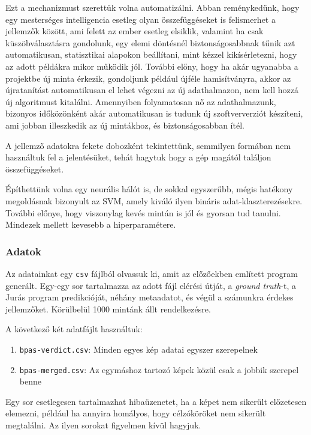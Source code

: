 Ezt a mechanizmust szerettük volna automatizálni. Abban reménykedünk, hogy egy 
mesterséges intelligencia esetleg olyan összefüggéseket is felismerhet a jellemzők
között, ami felett az ember esetleg elsiklik, valamint ha csak küszöbválasztásra
gondolunk, egy elemi döntésnél biztonságosabbnak tűnik azt automatikusan, statisztikai
alapokon beállítani, mint kézzel kikísérletezni, hogy az adott példákra mikor működik jól.
További előny, hogy ha akár ugyanabba a projektbe új minta érkezik, gondoljunk például újféle 
hamisítványra, akkor az újratanítást automatikusan el lehet végezni az új adathalmazon,
nem kell hozzá új algoritmust kitalálni. Amennyiben folyamatosan nő az adathalmazunk, 
bizonyos időközönként akár automatikusan is tudunk új szoftververziót készíteni,
ami jobban illeszkedik az új mintákhoz, és biztonságosabban ítél.


A jellemző adatokra fekete dobozként tekintettünk, semmilyen formában nem használtuk fel
a jelentésüket, tehát hagytuk hogy a gép magától találjon összefüggéseket.


Építhettünk volna egy neurális hálót is, de sokkal egyszerűbb, mégis hatékony
megoldásnak bizonyult az SVM, amely kiváló ilyen bináris adat-klaszterezésekre.
További előnye, hogy viszonylag kevés mintán is jól és gyorsan tud tanulni.
Mindezek mellett kevesebb a hiperparamétere.


\subsubsection{Adatok}
\label{sec:adatok}

Az adatainkat egy \texttt{csv} fájlból olvassuk ki, amit az előzőekben említett program 
generált. Egy-egy sor tartalmazza az adott fájl elérési útját, a \textit{ground truth}-t,
a Jurás program predikcióját, néhány metaadatot, és végül a számunkra érdekes jellemzőket.
Körülbelül 1000 mintánk állt rendelkezésre.

\noindent
A következő két adatfájlt használtuk:

\begin{enumerate}
\item
	\texttt{bpas-verdict.csv}: Minden egyes kép adatai egyszer szerepelnek
\item
	\texttt{bpas-merged.csv}: Az egymáshoz tartozó képek közül csak a jobbik szerepel benne
\end{enumerate}

Egy sor esetlegesen tartalmazhat hibaüzenetet, ha a képet nem sikerült előzetesen elemezni, például 
ha annyira homályos, hogy célzóköröket nem sikerült megtalálni. Az ilyen sorokat figyelmen kívül hagyjuk.

